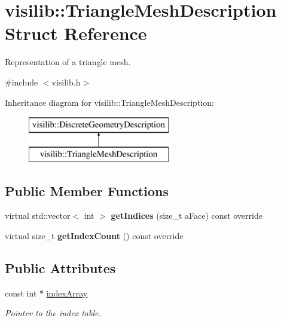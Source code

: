 \hypertarget{structvisilib_1_1_triangle_mesh_description}{}\section{visilib\+::Triangle\+Mesh\+Description Struct Reference}
\label{structvisilib_1_1_triangle_mesh_description}


Representation of a triangle mesh.  




{\ttfamily \#include $<$visilib.\+h$>$}

Inheritance diagram for visilib\+::Triangle\+Mesh\+Description\+:\begin{figure}[H]
\begin{center}
\leavevmode
\includegraphics[height=2.000000cm]{structvisilib_1_1_triangle_mesh_description}
\end{center}
\end{figure}
\subsection*{Public Member Functions}
\begin{DoxyCompactItemize}
\item 
\mbox{\label{structvisilib_1_1_triangle_mesh_description_ad9125f498b0e5eb05001e8706e7393f6}} 
virtual std\+::vector$<$ int $>$ {\bfseries get\+Indices} (size\+\_\+t a\+Face) const override
\item 
\mbox{\label{structvisilib_1_1_triangle_mesh_description_a2ad71fb110d51e86900312b4d2ac5cfd}} 
virtual size\+\_\+t {\bfseries get\+Index\+Count} () const override
\end{DoxyCompactItemize}
\subsection*{Public Attributes}
\begin{DoxyCompactItemize}
\item 
\mbox{\label{structvisilib_1_1_triangle_mesh_description_ad066f88f5351109e3900ae7356da5675}} 
const int $\ast$ \mbox{\hyperlink{structvisilib_1_1_triangle_mesh_description_ad066f88f5351109e3900ae7356da5675}{index\+Array}}
\begin{DoxyCompactList}\small\item\em Pointer to the index table. \end{DoxyCompactList}\end{DoxyCompactItemize}


